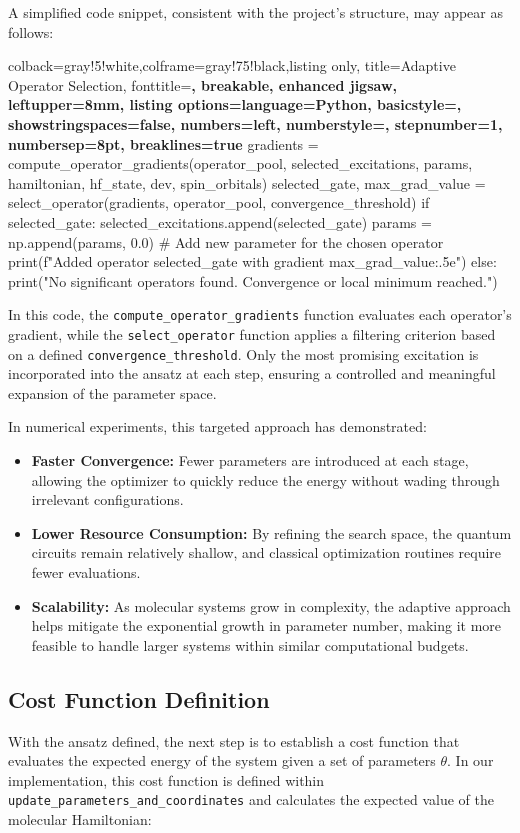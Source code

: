 A simplified code snippet, consistent with the project’s structure, may appear as follows:

\begin{tcblisting}{colback=gray!5!white,colframe=gray!75!black,listing only,
  title=Adaptive Operator Selection, fonttitle=\bfseries, breakable, enhanced jigsaw, leftupper=8mm,
  listing options={language=Python, basicstyle=\ttfamily\small,
  showstringspaces=false, numbers=left, numberstyle=\footnotesize, stepnumber=1, numbersep=8pt, breaklines=true}}
gradients = compute_operator_gradients(operator_pool, selected_excitations, params, hamiltonian, hf_state, dev, spin_orbitals)
selected_gate, max_grad_value = select_operator(gradients, operator_pool, convergence_threshold)
if selected_gate:
    selected_excitations.append(selected_gate)
    params = np.append(params, 0.0)  # Add new parameter for the chosen operator
    print(f"Added operator {selected_gate} with gradient {max_grad_value:.5e}")
else:
    print("No significant operators found. Convergence or local minimum reached.")
\end{tcblisting}

In this code, the \texttt{compute\_operator\_gradients} function evaluates each operator’s gradient, while the \texttt{select\_operator} function applies a filtering criterion based on a defined \texttt{convergence\_threshold}. Only the most promising excitation is incorporated into the ansatz at each step, ensuring a controlled and meaningful expansion of the parameter space.

In numerical experiments, this targeted approach has demonstrated:
\begin{itemize}
    \item \textbf{Faster Convergence:} Fewer parameters are introduced at each stage, allowing the optimizer to quickly reduce the energy without wading through irrelevant configurations.
    \item \textbf{Lower Resource Consumption:} By refining the search space, the quantum circuits remain relatively shallow, and classical optimization routines require fewer evaluations.
    \item \textbf{Scalability:} As molecular systems grow in complexity, the adaptive approach helps mitigate the exponential growth in parameter number, making it more feasible to handle larger systems within similar computational budgets.
\end{itemize}


\subsection{Cost Function Definition}
With the ansatz defined, the next step is to establish a cost function that evaluates the expected energy of the system given a set of parameters \(\theta\). In our implementation, this cost function is defined within \texttt{update\_parameters\_and\_coordinates} and calculates the expected value of the molecular Hamiltonian:
  
